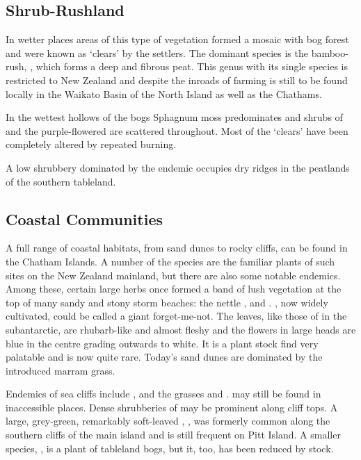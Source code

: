 \subsection{Shrub-Rushland}

In wetter places areas of this type of vegetation formed a mosaic with bog forest and were known as `clears' by the settlers.
The dominant species is the bamboo-rush, , which forms a deep and fibrous peat.
This genus with its single species is restricted to New Zealand and despite the inroads of farming is still to be found locally in the Waikato Basin of the North Island as well as the Chathams.

In the wettest hollows of the bogs Sphagnum moss predominates and shrubs of  and the purple-flowered  are scattered throughout.
Most of the `clears' have been completely altered by repeated burning.

A low shrubbery dominated by the endemic  occupies dry ridges in the peatlands of the southern tableland.

\subsection{Coastal Communities}

A full range of coastal habitats, from sand dunes to rocky cliffs, can be found in the Chatham Islands.
A number of the species are the familiar plants of such sites on the New Zealand mainland, but there are also some notable endemics.
Among these, certain large herbs once formed a band of lush vegetation at the top of many sandy and stony storm beaches: the nettle ,  and . , now widely cultivated, could be called a giant forget-me-not.
The leaves, like those of  in the subantarctic, are rhubarb-like and almost fleshy and the flowers in large heads are blue in the centre grading outwards to white.
It is a plant stock find very palatable and is now quite rare.
Today's sand dunes are dominated by the introduced marram grass.

Endemics of sea cliffs include ,  and the grasses  and .  may still be found in inaccessible places.
Dense shrubberies of  may be prominent along cliff tops.
A large, grey-green, remarkably soft-leaved , , was formerly common along the southern cliffs of the main island and is still frequent on Pitt Island.
A smaller species, , is a plant of tableland bogs, but it, too, has been reduced by stock.

